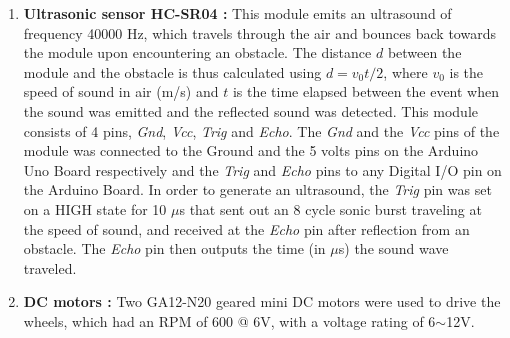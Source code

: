 \documentclass[12pt]{report}
\begin{document}
\begin{justify}
\begin{enumerate}
\item \textbf{Ultrasonic sensor HC-SR04 :} This module emits an ultrasound of frequency 40000 Hz, which travels through the air and bounces back towards the module upon encountering an obstacle. The distance $d$ between the module and the obstacle is thus calculated using $d = v_0 t/2$, where  $v_0$ is the speed of sound in air (m/s) and $t$ is the time elapsed between the event when the sound was emitted and the reflected sound was detected. This module consists of 4 pins, \textit{Gnd}, \textit{Vcc}, \textit{Trig} and \textit{Echo}. The \textit{Gnd} and the \textit{Vcc} pins of the module was connected to the Ground and the 5 volts pins on the Arduino Uno Board respectively and the \textit{Trig} and \textit{Echo} pins to any Digital I/O pin on the Arduino Board. In order to generate an ultrasound, the \textit{Trig} pin was set on a HIGH state for 10 $\mu$s that sent out an 8 cycle sonic burst traveling at the speed of sound, and received at the \textit{Echo} pin after reflection from an obstacle. The \textit{Echo} pin then outputs the time (in $\mu$s) the sound wave traveled.





\item \textbf{DC motors :} Two GA12-N20 geared mini DC motors were used to drive the wheels, which had an RPM of 600 @ 6V, with a voltage rating of 6$\sim$12V.
\end{enumerate}


\end{justify}
\end{document}
